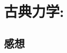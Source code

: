 \documentclass[../../sp_2017.tex]{subfiles}
\begin{document}
\setcounter{section}{2}
\section{古典力学:}


\subsection*{感想}
\end{document}
